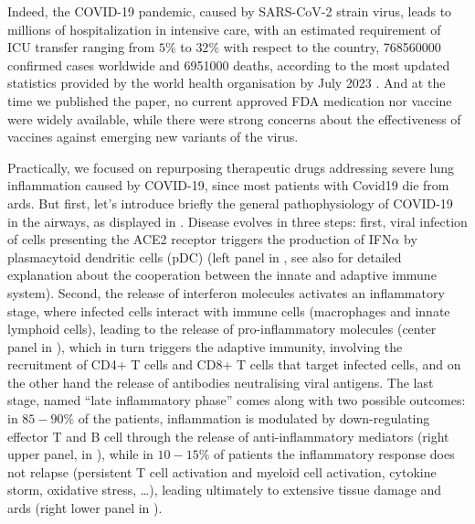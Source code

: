 {Indeed, the COVID-19 pandemic, caused by SARS-CoV-2 strain virus, leads to millions of hospitalization in intensive care, with an estimated requirement of ICU transfer ranging from $5\%$ to $32\%$ with respect to the country, \num{768560000} confirmed cases worldwide and \num{6951000} deaths, according to the most updated statistics provided by the world health organisation by July 2023 \autocite{abate_etal20}. And at the time we published the paper, no current approved FDA medication nor vaccine were widely available, while there were strong concerns about the effectiveness of vaccines against emerging new variants of the virus.


Practically, we focused on repurposing therapeutic drugs addressing severe lung inflammation caused by COVID-19, since most patients with Covid19 die from \acrfull{ards}. But first, let's introduce briefly the general pathophysiology of COVID-19 in the airways, as displayed in . Disease evolves in three steps: first, viral infection of cells presenting the ACE2 receptor triggers the production of IFN$\alpha$ by plasmacytoid dendritic cells (pDC) (left panel in , see also  for detailed explanation about the cooperation between the innate and adaptive immune system). Second, the release of interferon molecules activates an inflammatory stage, where infected cells interact with immune cells (macrophages and innate lymphoid cells), leading to the release of pro-inflammatory molecules (center panel in ), which in turn triggers the adaptive immunity, involving the recruitment of CD4+ T cells and CD8+ T cells that target infected cells, and on the other hand the release of antibodies neutralising viral antigens. The last stage, named \enquote{late inflammatory phase} comes along with two possible outcomes: in $85-90\%$ of the patients, inflammation is modulated by down-regulating effector T and B cell through the release of anti-inflammatory mediators (right upper panel, in ), while in $10-15\%$ of patients the inflammatory response does not relapse (persistent T cell activation and myeloid cell activation, cytokine storm, oxidative stress, \ldots), leading ultimately to extensive tissue damage and \acrshort{ards} (right lower panel in ).



}
